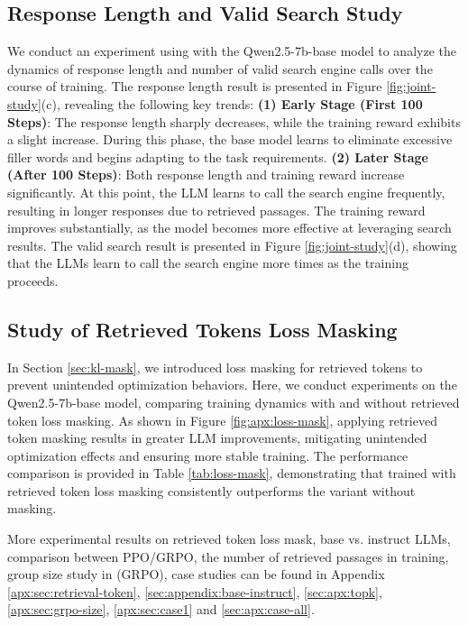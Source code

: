 \subsection{Response Length and Valid Search Study}

We conduct an experiment using \Ours with the Qwen2.5-7b-base model to analyze the dynamics of response length and number of valid search engine calls over the course of training. 
The response length result is presented in Figure \ref{fig:joint-study}(c), revealing the following key trends:
\textbf{(1) Early Stage (First 100 Steps)}: The response length sharply decreases, while the training reward exhibits a slight increase. During this phase, the base model learns to eliminate excessive filler words and begins adapting to the task requirements.
\textbf{(2) Later Stage (After 100 Steps)}: Both response length and training reward increase significantly. At this point, the LLM learns to call the search engine frequently, resulting in longer responses due to retrieved passages. The training reward improves substantially, as the model becomes more effective at leveraging search results.
The valid search result is presented in Figure \ref{fig:joint-study}(d), showing that the LLMs learn to call the search engine more times as the training proceeds.

\subsection{Study of Retrieved Tokens Loss Masking}

In Section \ref{sec:kl-mask}, we introduced loss masking for retrieved tokens to prevent unintended optimization behaviors. 
Here, we conduct experiments on the Qwen2.5-7b-base model, comparing training dynamics with and without retrieved token loss masking. 
As shown in Figure \ref{fig:apx:loss-mask}, applying retrieved token masking results in greater LLM improvements, mitigating unintended optimization effects and ensuring more stable training.
The performance comparison is provided in Table \ref{tab:loss-mask}, demonstrating that \Ours trained with retrieved token loss masking consistently outperforms the variant without masking.

More experimental results on retrieved token loss mask, base vs. instruct LLMs, comparison between PPO/GRPO, the number of retrieved passages in \Ours training, group size study in \Ours (GRPO), case studies can be found in Appendix \ref{apx:sec:retrieval-token}, \ref{sec:appendix:base-instruct}, \ref{sec:apx:topk}, \ref{apx:sec:grpo-size}, \ref{apx:sec:case1} and \ref{sec:apx:case-all}.

